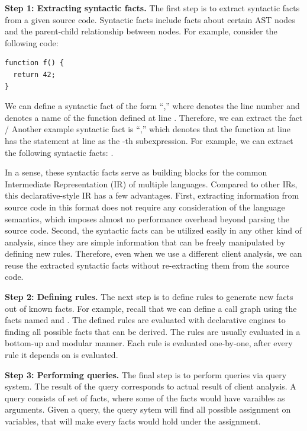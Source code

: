 \medskip
\textbf{Step 1: Extracting syntactic facts.}
The first step is to extract syntactic facts from a given source code.
Syntactic facts include facts about certain AST nodes and
the parent-child relationship between nodes. For example, consider
the following code:

\begin{lstlisting}[style=cpp,xleftmargin=2.5em]
function f() {
  return 42;
}
\end{lstlisting}
We can define a syntactic fact of the form ``,''
where  denotes the line number and 
denotes a name of the function defined at line .
Therefore, we can extract the fact /
Another example syntactic fact is ``,''
which denotes that the function at line  has the statement
at line  as the -th subexpression.
For example, we can extract the following syntactic facts:
.

In a sense, these syntactic facts serve as building blocks for the
common Intermediate Representation (IR) of multiple languages.
Compared to other IRs, this declarative-style IR has a few advantages.
First, extracting information from source code in this format does not
require any consideration of the language semantics, which imposes
almost no performance overhead beyond parsing the source code.
Second, the syntactic facts can be utilized easily in any other kind of
analysis, since they are simple information that can be freely
manipulated by defining new rules. Therefore, even when we use a different
client analysis, we can reuse the extracted syntactic facts
without re-extracting them from the source code.


\medskip
\textbf{Step 2: Defining rules.}
The next step is to define rules to generate new facts out of known facts.
For example, recall that we can define a call graph
 using the facts
named  and .
The defined rules are evaluated with declarative engines to finding all possible
facts that can be derived. The rules are usually evaluated in a bottom-up
and modular manner. Each rule is evaluated one-by-one, after every
rule it depends on is evaluated. 

\textbf{Step 3: Performing queries.}
The final step is to perform queries via query system.
The result of the query corresponds to actual result of client analysis.
A query consists of set of facts, where some of the facts would have
varaibles as arguments. Given a query, the query sytem will find all possible
assignment on variables, that will make every facts would hold under
the assignment.

